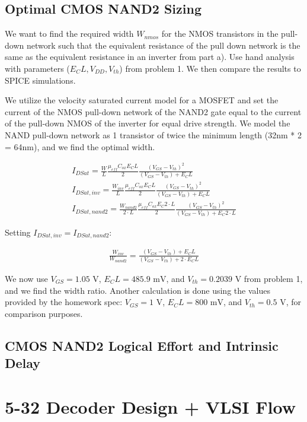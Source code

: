 \documentclass[11pt]{article}
\begin{document}
\subsection{Optimal CMOS NAND2 Sizing}
We want to find the required width $W_{nmos}$ for the NMOS transistors in the pull-down network such that the equivalent resistance of the pull down network is the same as the equivalent resistance in an inverter from part a). Use hand analysis with parameters ($E_C L, V_{DD}, V_{th}$) from problem 1. We then compare the results to SPICE simulations.

We utilize the velocity saturated current model for a MOSFET and set the current of the NMOS pull-down network of the NAND2 gate equal to the current of the pull-down NMOS of the inverter for equal drive strength. We model the NAND pull-down network as 1 transistor of twice the minimum length (32nm * 2 = 64nm), and we find the optimal width.

\begin{eqnarray}
	I_{DSat} = \frac{W}{L} \frac{\mu_{eff} C_{ox} E_C L}{2} \frac{(V_{GS} - V_{th})^2}{(V_{GS} - V_{th}) + E_C L} \nonumber \\
	I_{DSat,inv} = \frac{W_{inv}}{L} \frac{\mu_{eff} C_{ox} E_C L}{2} \frac{(V_{GS} - V_{th})^2}{(V_{GS} - V_{th}) + E_C L} \nonumber \\
	I_{DSat,nand2} = \frac{W_{nand2}}{2 \cdot L} \frac{\mu_{eff} C_{ox} E_C 2 \cdot L}{2} \frac{(V_{GS} - V_{th})^2}{(V_{GS} - V_{th}) + E_C 2 \cdot L} \nonumber
\end{eqnarray}

Setting $I_{DSat,inv} = I_{DSat,nand2}$:

\begin{eqnarray}
	\frac{W_{inv}}{W_{nand2}} = \frac{(V_{GS} - V_{th}) + E_C L}{(V_{GS} - V_{th}) + 2 \cdot E_C L} \nonumber
\end{eqnarray}

We now use $V_{GS} = 1.05 \text{ V}$, $E_C L = 485.9 \text{ mV}$, and $V_{th} = 0.2039 \text{ V}$ from problem 1, and we find the width ratio. Another calculation is done using the values provided by the homework spec: $V_{GS} = 1 \text{ V}$, $E_C L = 800 \text{ mV}$, and $V_{th} = 0.5 \text{ V}$, for comparison purposes.
 
\subsection{CMOS NAND2 Logical Effort and Intrinsic Delay}


\section{5-32 Decoder Design + VLSI Flow}
\end{document}
